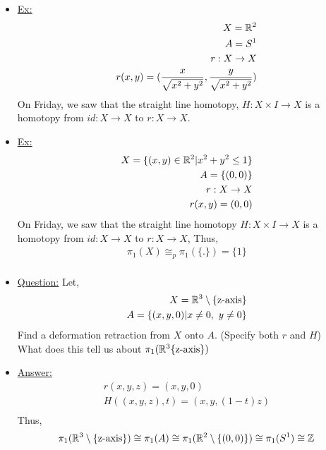     \begin{itemize}
    \item\underline{Ex:}
        \begin{align*}
            X=\mathbb{R}^2\\
            A=S^1\\
            r:X\rightarrow X\\
            r(x,y)=(\frac{x}{\sqrt{x^2+y^2}},\frac{y}{\sqrt{x^2+y^2}})
        \end{align*}
        On Friday, we saw that the straight line homotopy, $H:X\times I\rightarrow X$
        is a homotopy from $id:X\rightarrow X$ to $r:X\rightarrow X$.
    \item \underline{Ex:}
        \begin{align*}
            X=\{(x,y)\in \mathbb{R}^2| x^2+y^2\leq 1\}\\
            A=\{(0,0)\}\\
            r: X\rightarrow X\\
            r(x,y)=(0,0)\\
        \end{align*}
        On Friday, we saw that the straight line homotopy $H:X\times I \rightarrow X$ is
        a homotopy from $id:X\rightarrow X$ to $r:X\rightarrow X$,
        Thus,
        \begin{align*}
            \pi_1(X)\cong_{p}\pi_1(\{.\})=\{1\}\\
        \end{align*}
    \item \underline{Question:} Let,
        \begin{align*}
            X=\mathbb{R}^3\setminus \{\text{z-axis}\}\\
            A=\{(x,y,0)| x\neq 0,\ y\neq 0\}\\
        \end{align*}
        Find a deformation retraction from $X$ onto $A$. (Specify both $r$ and $H$)\\
        What does this tell us about $\pi_1(\mathbb{R}^3\{\text{z-axis}\})$
    \item \underline{Answer:}
        \begin{align*}
            r(x,y,z)=(x,y,0)\\
            H((x,y,z),t)=(x,y, (1-t)z)\\
        \end{align*}
        Thus,
        \begin{align*}
            \pi_1(\mathbb{R}^3\setminus\{\text{z-axis}\})\cong \pi_1(A)\cong \pi_1(\mathbb{R}^2\setminus\{(0,0)\})\cong \pi_1(S^1)\cong \mathbb{Z}\\
        \end{align*}
    \end{itemize}
